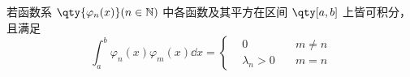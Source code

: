 
若函数系 $\qty{\varphi_n(x)}(n\in \mathbb{N})$ 中各函数及其平方在区间 $\qty[a,b]$ 上皆可积分，且满足
\begin{equation}
\int_a^b\varphi_n(x)\varphi_m(x)\dd x=
\left\{
    \begin{aligned}
    &0\quad &m\neq n\\
   &\lambda_n>0\quad &m=n
    \end{aligned}
\right.
\end{equation}
